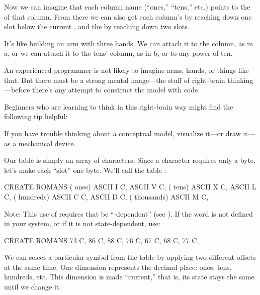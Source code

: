 \noindent Now we can imagine that each column name (``ones,'' ``tens,''
etc.) points to the  of that column. From there we can also
get each column's  by reaching down one slot below the
current , and the  by reaching down two slots.

It's like building an arm with three hands. We can attach it to the
 column, as in a, or we can attach it to the tens'
column, as in b, or to any power of ten.



An experienced \Forth{} programmer is not likely to imagine arms,
hands, or things like that. But there must be a strong mental image---the
stuff of right-brain thinking---before there's any attempt to construct the
model with code.

Beginners who are learning to think in this right-brain way might
find the following tip helpful:

\begin{tip}
If you have trouble thinking about a conceptual model,
visualize it---or draw it---as a mechanical device.
\end{tip}
Our table is simply an array of characters. Since a character requires
only a byte, let's make each ``slot'' one byte. We'll call the table
:

\begin{Code}
CREATE ROMANS    ( ones)  ASCII I  C,   ASCII V  C,
                 ( tens)  ASCII X  C,   ASCII L  C,
             ( hundreds)  ASCII C  C,   ASCII D  C,
            ( thousands)  ASCII M  C,
\end{Code}
Note: This use of  requires that  be
``-dependent'' (see ). If the word 
is not defined in your system, or if it is not state-dependent, use:

\begin{Code}
CREATE ROMANS  73 C,  86 C,  88 C,  76 C,
   67 C,  68 C,  77 C,
\end{Code}
We can select a particular symbol from the table by applying two
different offsets at the same time. One dimension represents the decimal
place: ones, tens, hundreds, etc. This dimension is made ``current,'' that
is, its state stays the same until we change it.

